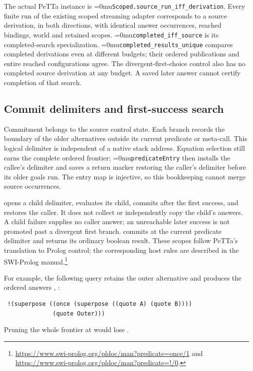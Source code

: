 \documentclass[11pt,a4paper]{article}
\newcommand{\code}[1]{\texttt{\detokenize{#1}}}
\newcommand{\name}[1]{\textup{\Urlmuskip=0mu\relax\nolinkurl{#1}}}
\begin{document}
The actual PeTTa instance is \name{Scoped.source_run_iff_derivation}. Every
finite run of the existing scoped streaming adapter corresponds to a source
derivation, in both directions, with identical answer occurrences, reached
bindings, world and retained scopes. \name{completed_iff_source} is its
completed-search specialization. \name{completed_results_unique} compares
completed derivations even at different budgets; their ordered publications
and entire reached configurations agree. The divergent-first-choice control
also has no completed source derivation at any budget. A saved later answer
cannot certify completion of that search.

\subsection*{Commit delimiters and first-success search}

Commitment belongs to the source control state. Each branch records the
boundary of the older alternatives outside its current predicate or
meta-call. This logical delimiter is independent of a native stack address.
Equation selection still earns the complete ordered frontier;
\name{predicateEntry} then installs the callee's delimiter and saves a return
marker restoring the caller's delimiter before its older goals run. The
entry map is injective, so this bookkeeping cannot merge source occurrences.

\code{once} opens a child delimiter, evaluates its child, commits after the
first success, and restores the caller. It does not collect or independently
copy the child's answers. A child failure supplies no caller answer; an
unreachable later success is not promoted past a divergent first branch.
\code{cut} commits at the current predicate delimiter and returns its ordinary
boolean result. These scopes follow PeTTa's translation to Prolog control;
the corresponding host rules are described in the SWI-Prolog manual.\footnote{\url{https://www.swi-prolog.org/pldoc/man?predicate=once/1}
and \url{https://www.swi-prolog.org/pldoc/man?predicate=!/0}.}

For example, the following query retains the outer alternative and produces
the ordered answers \code{A}, \code{Outer}:
\begin{verbatim}
 !(superpose ((once (superpose ((quote A) (quote B))))
              (quote Outer)))
\end{verbatim}
Pruning the whole frontier at \code{once} would lose \code{Outer}.
\end{document}
